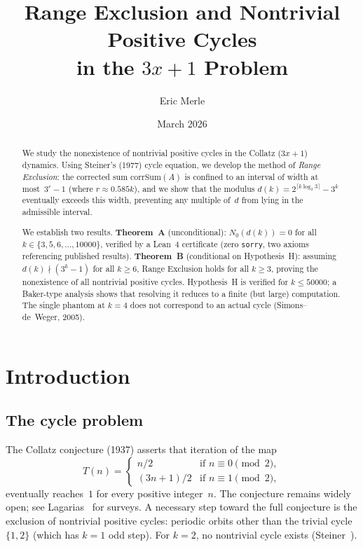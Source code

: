 \documentclass[11pt, a4paper]{amsart}
\title[Range Exclusion for Collatz cycles]{%
  Range Exclusion and Nontrivial Positive Cycles\\
  in the $3x{+}1$ Problem}
\author{Eric Merle}
\date{March 2026}
\theoremstyle{plain}
\theoremstyle{definition}
\theoremstyle{remark}
\newcommand{\corrSum}{\mathrm{corrSum}}
\begin{document}
\begin{abstract}
We study the nonexistence of nontrivial positive cycles in the Collatz
($3x{+}1$) dynamics.  Using Steiner's (1977) cycle equation, we
develop the method of \emph{Range Exclusion}: the corrected sum
$\corrSum(A)$ is confined to an interval of width at most~$3^r - 1$
(where $r \approx 0.585k$), and we show that the modulus
$d(k) = 2^{\lceil k\log_2 3\rceil} - 3^k$ eventually exceeds
this width, preventing any multiple of~$d$ from lying in the
admissible interval.

We establish two results.
\textbf{Theorem~A} (unconditional): $N_0(d(k)) = 0$
for all $k \in \{3, 5, 6, \ldots, 10000\}$,
verified by a Lean~4 certificate (zero \texttt{sorry},
two axioms referencing published results).
\textbf{Theorem~B} (conditional on Hypothesis~H):
assuming $d(k) \nmid (3^k - 1)$ for all $k \geq 6$,
Range Exclusion holds for all $k \geq 3$, proving the
nonexistence of all nontrivial positive cycles.
Hypothesis~H is verified for $k \leq 50000$;
a Baker-type analysis shows that resolving it
reduces to a finite (but large) computation.
The single phantom at $k = 4$ does not correspond to an
actual cycle (Simons--de~Weger, 2005).
\end{abstract}

\maketitle
\tableofcontents

\section{Introduction}\label{sec:intro}

\subsection{The cycle problem}\label{ssec:cycle-problem}

The Collatz conjecture (1937) asserts that iteration of the map
\begin{equation}\label{eq:collatz}
  T(n) = \begin{cases}
    n/2       & \text{if } n \equiv 0 \pmod{2}, \\
    (3n+1)/2  & \text{if } n \equiv 1 \pmod{2},
  \end{cases}
\end{equation}
eventually reaches~$1$ for every positive integer~$n$.
The conjecture remains widely open; see
Lagarias~\cite{Lagarias1985,Lagarias2010} for surveys.
A necessary step toward the full conjecture is the exclusion
of nontrivial positive cycles: periodic orbits other than
the trivial cycle $\{1, 2\}$ (which has $k = 1$ odd step).
For $k = 2$, no nontrivial cycle exists
(Steiner~\cite{Steiner1977}).
\end{document}
